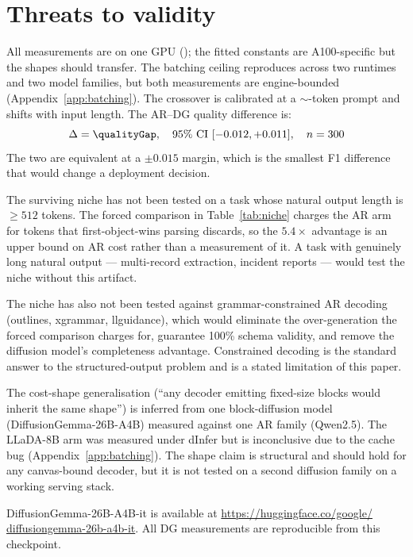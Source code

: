 \section{Threats to validity}
\label{sec:threats}

All measurements are on one GPU (\gpuModel{}); the fitted constants are
A100-specific but the shapes should transfer. The batching ceiling
reproduces across two runtimes and two model families, but both
measurements are engine-bounded (Appendix~\ref{app:batching}). The
crossover is calibrated at a $\sim$-token prompt and shifts
with input length. The AR--DG quality difference is:
\begin{equation}
\Delta = \qualityGap, \quad \text{95\% CI } [-0.012, +0.011], \quad n = 300
\end{equation}
The two are equivalent at a $\pm 0.015$ margin, which is the smallest F1
difference that would change a deployment decision.

The surviving niche has not been tested on a task whose natural output
length is $\geq 512$ tokens. The forced comparison in
Table~\ref{tab:niche} charges the AR arm for tokens that first-object-wins
parsing discards, so the $5.4\times$ advantage is an upper bound on AR
cost rather than a measurement of it. A task with genuinely long natural
output --- multi-record extraction, incident reports --- would test the
niche without this artifact.

The niche has also not been tested against grammar-constrained AR decoding
(outlines, xgrammar, llguidance), which would eliminate the over-generation
the forced comparison charges for, guarantee 100\% schema validity, and
remove the diffusion model's completeness advantage. Constrained decoding
is the standard answer to the structured-output problem and is a stated
limitation of this paper.

The cost-shape generalisation (``any decoder emitting fixed-size blocks
would inherit the same shape'') is inferred from one block-diffusion model
(DiffusionGemma-26B-A4B) measured against one AR family (Qwen2.5). The
LLaDA-8B arm was measured under dInfer but is inconclusive due to the
cache bug (Appendix~\ref{app:batching}). The shape claim is structural
and should hold for any canvas-bound decoder, but it is not tested on a
second diffusion family on a working serving stack.

DiffusionGemma-26B-A4B-it is available at
\url{https://huggingface.co/google/}\\
\url{diffusiongemma-26b-a4b-it}. All DG
measurements are reproducible from this checkpoint.
